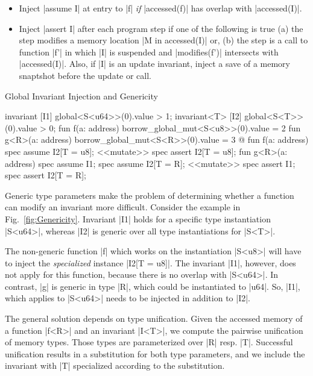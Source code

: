 \begin{itemize}
\item Inject |assume I| at entry to |f| \emph{if} |accessed(f)| has overlap with
  |accessed(I)|.
\item Inject |assert I| after each program step if one of the following is true
  (a) the step modifies a memory location |M in accessed(I)| or, (b) the step is
  a call to function |f'| in which |I| is suspended and |modifies(f')|
  intersects with |accessed(I)|.  Also, if |I| is an update invariant, inject a
  save of a memory snaptshot before the update or call.
\end{itemize}

\vspace{-1ex}

\begin{Figure}
  \caption{Global Invariant Injection and Genericity}
  \label{fig:Genericity}
  \centering
\begin{MoveBox}
  invariant [I1] global<S<u64>>(0).value > 1;
  invariant<T> [I2] global<S<T>>(0).value > 0;
  fun f(a: address) { borrow_global_mut<S<u8>>(0).value = 2 }
  fun g<R>(a: address) { borrow_global_mut<S<R>>(0).value = 3 }
  @\transform@
  fun f(a: address) {
    spec assume I2[T = u8];
    <<mutate>>
    spec assert I2[T = u8];
  }
  fun g<R>(a: address) {
    spec assume I1; spec assume I2[T = R];
    <<mutate>>
    spec assert I1; spec assert I2[T = R];
  }
\end{MoveBox}
\end{Figure}

Generic type parameters make the problem of determining whether a function can
modify an invariant more difficult.  Consider the example in
Fig.~\ref{fig:Genericity}. Invariant |I1| holds for a specific type
instantiation |S<u64>|, whereas |I2| is generic over all type instantiations for
|S<T>|.

The non-generic function |f| which works on the instantiation |S<u8>| will have
to inject the \emph{specialized} instance |I2[T = u8]|. The invariant |I1|,
however, does not apply for this function, because there is no overlap with
|S<u64>|.  In contrast, |g| is generic in type |R|, which could be instantiated
to |u64|. So, |I1|, which applies to |S<u64>| needs to be injected
in addition to |I2|.

The general solution depends on type unification.  Given the accessed memory of
a function |f<R>| and an invariant |I<T>|, we compute the pairwise unification
of memory types. Those types are parameterized over |R| resp. |T|. Successful
unification results in a substitution for both type parameters, and we include
the invariant with |T| specialized according to the substitution.


